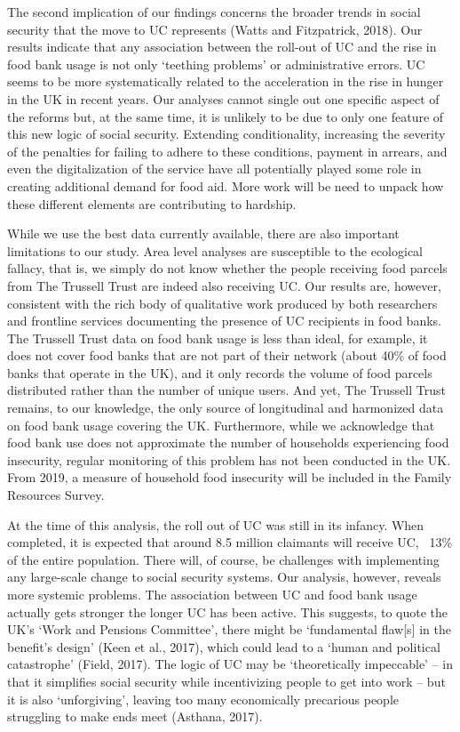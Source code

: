 \documentclass[12pt,article,oneside]{memoir}
\begin{document}
The second implication of our findings concerns the broader trends in social security that the move to UC represents (Watts and Fitzpatrick, 2018). Our results indicate that any association between the roll-out of UC and the rise in food bank usage is not only `teething problems' or administrative errors. UC seems to be more systematically related to the acceleration in the rise in hunger in the UK in recent years. Our analyses cannot single out one specific aspect of the reforms but, at the same time, it is unlikely to be due to only one feature of this new logic of social security. Extending conditionality, increasing the severity of the penalties for failing to adhere to these conditions, payment in arrears, and even the digitalization of the service have all potentially played some role in creating additional demand for food aid. More work will be need to unpack how these different elements are contributing to hardship.  

While we use the best data currently available, there are also important limitations to our study. Area level analyses are susceptible to the ecological fallacy, that is, we simply do not know whether the people receiving food parcels from The Trussell Trust are indeed also receiving UC. Our results are, however, consistent with the rich body of qualitative work produced by both researchers and frontline services documenting the presence of UC recipients in food banks. The Trussell Trust data on food bank usage is less than ideal, for example, it does not cover food banks that are not part of their network (about 40\% of food banks that operate in the UK), and it only records the volume of food parcels distributed rather than the number of unique users. And yet, The Trussell Trust remains, to our knowledge, the only source of longitudinal and harmonized data on food bank usage covering the UK. Furthermore, while we acknowledge that food bank use does not approximate the number of households experiencing food insecurity, regular monitoring of this problem has not been conducted in the UK. From 2019, a measure of household food insecurity will be included in the Family Resources Survey. 

At the time of this analysis, the roll out of UC was still in its infancy. When completed, it is expected that around 8.5 million claimants will receive UC, ~13\% of the entire population. There will, of course, be challenges with implementing any large-scale change to social security systems. Our analysis, however, reveals more systemic problems. The association between UC and food bank usage actually gets stronger the longer UC has been active. This suggests, to quote the UK’s `Work and Pensions Committee', there might be `fundamental flaw[s] in the benefit's design' (Keen et al., 2017), which could lead to a `human and political catastrophe' (Field, 2017). The logic of UC may be `theoretically impeccable' – in that it simplifies social security while incentivizing people to get into work – but it is also `unforgiving', leaving too many economically precarious people struggling to make ends meet (Asthana, 2017). 
\end{document}

